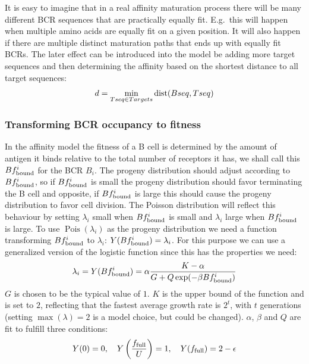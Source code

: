 It is easy to imagine that in a real affinity maturation process there will be many different BCR sequences that are practically equally fit.
E.g.\ this will happen when multiple amino acids are equally fit on a given position.
It will also happen if there are multiple distinct maturation paths that ends up with equally fit BCRs.
The later effect can be introduced into the model be adding more target sequences and then determining the affinity based on the shortest distance to all target sequences:
$$
d = \mathop{\mathrm{\min}}\limits_{Tseq \in Targets} \operatorname{dist}(Bseq, Tseq)
$$






\subsubsection{Transforming BCR occupancy to fitness}
In the affinity model the fitness of a B cell is determined by the amount of antigen it binds relative to the total number of receptors it has, we shall call this $Bf^i_{\text{bound}}$ for the BCR $B_i$.
The progeny distribution should adjust according to $Bf^i_{\text{bound}}$, so if $Bf^i_{\text{bound}}$ is small the progeny distribution should favor terminating the B cell and opposite, if $Bf^i_{\text{bound}}$ is large this should cause the progeny distribution to favor cell division.
The Poisson distribution will reflect this behaviour by setting $\lambda_i$ small when $Bf^i_{\text{bound}}$ is small and $\lambda_i$ large when $Bf^i_{\text{bound}}$ is large.
To use $\operatorname{Pois}(\lambda_i)$ as the progeny distribution we need a function transforming $Bf^i_{\text{bound}}$ to $\lambda_i$: $Y(Bf^i_{\text{bound}}) = \lambda_i$.
For this purpose we can use a generalized version of the logistic function since this has the properties we need:
\begin{equation}
\lambda_i = Y(Bf^i_{\text{bound}}) = \alpha \frac{K - \alpha}{G + Q \exp(-\beta Bf^i_{\text{bound}})}
  \label{eq:BA_trans}
\end{equation}
$G$ is chosen to be the typical value of $1$.
$K$ is the upper bound of the function and is set to $2$, reflecting that the fastest average growth rate is $2^t$, with $t$ generations (setting $\operatorname{max}(\lambda) = 2$ is a model choice, but could be changed).
$\alpha$, $\beta$ and $Q$ are fit to fulfill three conditions:
\begin{equation}
Y(0) = 0, \ \ \ Y \left(\frac{f_{\text{full}}}{U} \right) = 1, \ \ \ Y(f_{\text{full}}) = 2 - \epsilon
  \label{eq:BA_cond}
\end{equation}
